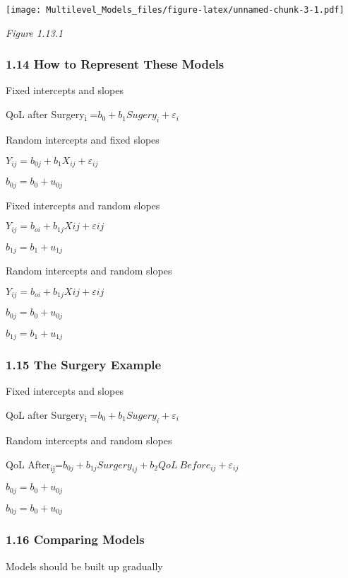 \documentclass[
]{article}
\begin{document}
\texttt{[image: Multilevel\_Models\_files/figure-latex/unnamed-chunk-3-1.pdf]}

\emph{Figure 1.13.1}

\hypertarget{how-to-represent-these-models}{%
\subsubsection{1.14 How to Represent These
Models}\label{how-to-represent-these-models}}

Fixed intercepts and slopes

QoL after Surgery\textsubscript{i} =\(b_0+b_1Sugery_i+\varepsilon_i\)

Random intercepts and fixed slopes

\(Y_{ij}=b_{0j}+b_1X_{ij}+\varepsilon_{ij}\)

\(b_{0j}=b_0+u_{0j}\)

Fixed intercepts and random slopes

\(Y_{ij}=b_{oi}+b_{1j}X{ij}+\varepsilon{ij}\)

\(b_{1j}=b_1+u_{1j}\)

Random intercepts and random slopes

\(Y_{ij}=b_{oi}+b_{1j}X{ij}+\varepsilon{ij}\)

\(b_{0j}=b_0+u_{0j}\)

\(b_{1j}=b_1+u_{1j}\)

\hypertarget{the-surgery-example}{%
\subsubsection{1.15 The Surgery Example}\label{the-surgery-example}}

Fixed intercepts and slopes

QoL after Surgery\textsubscript{i} =\(b_0+b_1Sugery_i+\varepsilon_i\)

Random intercepts and random slopes

QoL
After\textsubscript{ij}=\(b_{0j}+b_{1j}Surgery_{ij}+b_2QoL \ Before_{ij}+\varepsilon_{ij}\)

\(b_{0j}=b_0+u_{0j}\)

\(b_{0j}=b_0+u_{0j}\)

\hypertarget{comparing-models}{%
\subsubsection{1.16 Comparing Models}\label{comparing-models}}

Models should be built up gradually
\end{document}
